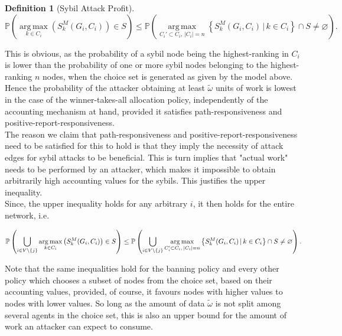 \documentclass[11pt,a4paper]{report}
\theoremstyle{definition}
\newtheorem{definition}{Definition}[section]
\theoremstyle{theorem}
\theoremstyle{proposition}
\theoremstyle{corollary}
\theoremstyle{lemma}
\theoremstyle{example}
\theoremstyle{remark}
\DeclareMathOperator*{\argmax}{arg\,max}
\begin{document}
\begin{definition}[Sybil Attack Profit]
\[
\mathbb{P}\left(\argmax\limits_{k\in{}C_i}\left(S_k^M(G_i,C_i)\right)\in{}S\right) \leq \mathbb{P}\left(\argmax\limits_{C_i'\subset{}C_i,\,|C_i|=n}\left\lbrace{}S_k^M(G_i,C_i)\,|\,k\in{}C_i\right\rbrace\cap{}S \neq \varnothing\right).
\]

\noindent{}This is obvious, as the probability of a sybil node being the highest-ranking in $C_i$ is lower than the probability of one or more sybil nodes belonging to the highest-ranking $n$ nodes, when the choice set is generated as given by the model above. Hence the probability of the attacker obtaining at least $\tilde{\omega}$ units of work is lowest in the case of the winner-takes-all allocation policy, independently of the accounting mechanism at hand, provided it satisfies path-responsiveness and positive-report-responsiveness.\vspace{1em}\\

\noindent{}The reason we claim that path-responsiveness and positive-report-responsiveness need to be satisfied for this to hold is that they imply the necessity of attack edges for sybil attacks to be beneficial. This is turn implies that "actual work" needs to be performed by an attacker, which makes it impossible to obtain arbitrarily high accounting values for the sybils. This justifies the upper inequality. \vspace{1em}\\

\noindent{}Since, the upper inequality holds for any arbitrary $i$, it then holds for the entire network, i.e.

\[
\mathbb{P}\left(\bigcup\limits_{i\in{}V\backslash\lbrace{}j\rbrace}\argmax\limits_{k\in{}C_i}\left(S_k^M(G_i,C_i)\right)\in{}S\right) \leq \mathbb{P}\left(\bigcup\limits_{i\in{}V\backslash\lbrace{}j\rbrace}\argmax\limits_{C_i'\subset{}C_i,\,|C_i|=n}\left\lbrace{}S_k^M(G_i,C_i)\,|\,k\in{}C_i\right\rbrace\cap{}S\neq\varnothing\right). \vspace{1em}\\
\] 

\noindent{}Note that the same inequalities hold for the banning policy and every other policy which chooses a subset of nodes from the choice set, based on their accounting values, provided, of course, it favours nodes with higher values to nodes with lower values. So long as the amount of data $\tilde{\omega}$ is not split among several agents in the choice set, this is also an upper bound for the amount of work an attacker can expect to consume.\vspace{1em}\\


\end{definition}
\end{document}
